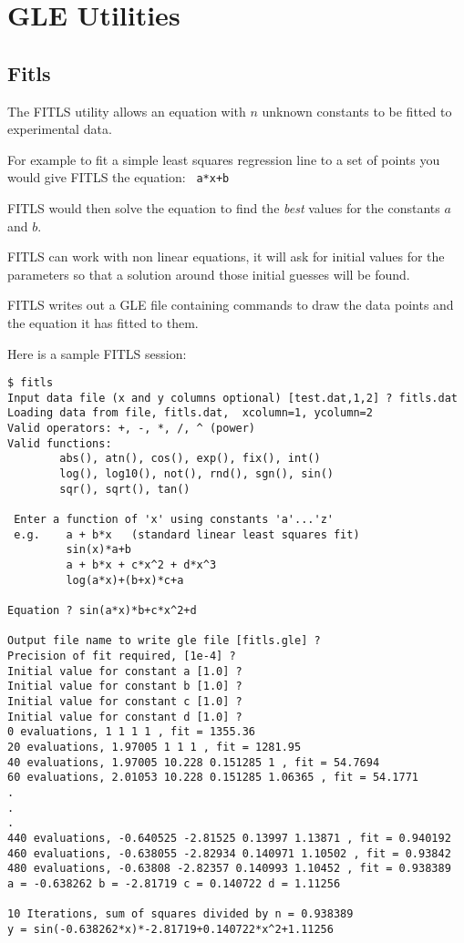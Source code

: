 \chapter {GLE Utilities}
\label{util:chap}
\section{Fitls}
The FITLS utility allows an equation with $n$ unknown constants to 
be fitted to experimental data.

For example to fit a simple least squares regression line to a set of 
points you would give FITLS the equation: \verb# a*x+b#

FITLS would then solve the equation to find the {\em best} values for
the constants $a$ and $b$. 

FITLS can work with non linear equations, it will ask for initial
values for the parameters so that a solution around those initial
guesses will be found.

FITLS writes out a GLE file containing commands to draw the data
points and the equation it has fitted to them.

Here is a sample FITLS session:
\begin{verbatim}
$ fitls
Input data file (x and y columns optional) [test.dat,1,2] ? fitls.dat
Loading data from file, fitls.dat,  xcolumn=1, ycolumn=2
Valid operators: +, -, *, /, ^ (power) 
Valid functions:
        abs(), atn(), cos(), exp(), fix(), int()
        log(), log10(), not(), rnd(), sgn(), sin()
        sqr(), sqrt(), tan()

 Enter a function of 'x' using constants 'a'...'z' 
 e.g.    a + b*x   (standard linear least squares fit) 
         sin(x)*a+b 
         a + b*x + c*x^2 + d*x^3  
         log(a*x)+(b+x)*c+a 

Equation ? sin(a*x)*b+c*x^2+d

Output file name to write gle file [fitls.gle] ?
Precision of fit required, [1e-4] ?
Initial value for constant a [1.0] ? 
Initial value for constant b [1.0] ? 
Initial value for constant c [1.0] ? 
Initial value for constant d [1.0] ? 
0 evaluations, 1 1 1 1 , fit = 1355.36 
20 evaluations, 1.97005 1 1 1 , fit = 1281.95 
40 evaluations, 1.97005 10.228 0.151285 1 , fit = 54.7694 
60 evaluations, 2.01053 10.228 0.151285 1.06365 , fit = 54.1771 
.
.
.
440 evaluations, -0.640525 -2.81525 0.13997 1.13871 , fit = 0.940192 
460 evaluations, -0.638055 -2.82934 0.140971 1.10502 , fit = 0.93842 
480 evaluations, -0.63808 -2.82357 0.140993 1.10452 , fit = 0.938389 
a = -0.638262 b = -2.81719 c = 0.140722 d = 1.11256 

10 Iterations, sum of squares divided by n = 0.938389
y = sin(-0.638262*x)*-2.81719+0.140722*x^2+1.11256
\end{verbatim}
\vspace*{1.0cm}
